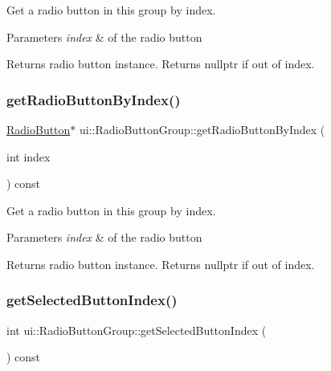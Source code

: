 Get a radio button in this group by index.


\begin{DoxyParams}{Parameters}
{\em index} & of the radio button \\
\hline
\end{DoxyParams}
\begin{DoxyReturn}{Returns}
radio button instance. Returns nullptr if out of index. 
\end{DoxyReturn}
\mbox{\label{classui_1_1RadioButtonGroup_af82618a1cef27bf24b3d0721d4cfaf14}} 
\subsubsection{\texorpdfstring{get\+Radio\+Button\+By\+Index()}{getRadioButtonByIndex()}\hspace{0.1cm}{\footnotesize\ttfamily [2/2]}}
{\footnotesize\ttfamily \hyperlink{classui_1_1RadioButton}{Radio\+Button}$\ast$ ui\+::\+Radio\+Button\+Group\+::get\+Radio\+Button\+By\+Index (\begin{DoxyParamCaption}\item[{int}]{index }\end{DoxyParamCaption}) const}

Get a radio button in this group by index.


\begin{DoxyParams}{Parameters}
{\em index} & of the radio button \\
\hline
\end{DoxyParams}
\begin{DoxyReturn}{Returns}
radio button instance. Returns nullptr if out of index. 
\end{DoxyReturn}
\mbox{\label{classui_1_1RadioButtonGroup_a918a8c5756b2e2ad02ddb8e87cb16f28}} 
\subsubsection{\texorpdfstring{get\+Selected\+Button\+Index()}{getSelectedButtonIndex()}\hspace{0.1cm}{\footnotesize\ttfamily [1/2]}}
{\footnotesize\ttfamily int ui\+::\+Radio\+Button\+Group\+::get\+Selected\+Button\+Index (\begin{DoxyParamCaption}{ }\end{DoxyParamCaption}) const\hspace{0.3cm}{\ttfamily [virtual]}}

